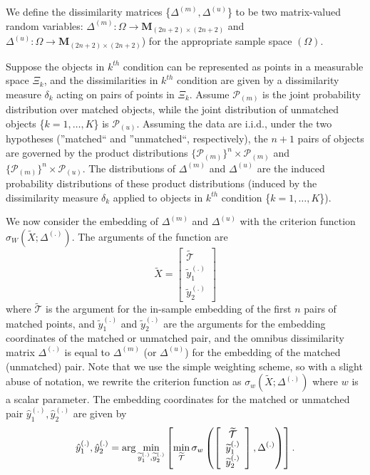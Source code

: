 \documentclass[12pt,oneside,final]{thesis}\usepackage[]{graphicx}\usepackage[]{color}
\begin{document}
We define the dissimilarity matrices \{$\Delta^{(m)},\Delta^{(u)}$\} to be  two matrix-valued random variables: $\Delta^{(m)}:\Omega \rightarrow \mathbf{M}_{(2n+2)\times (2n+2)} $ and  $\Delta^{(u)}:\Omega \rightarrow \mathbf{M}_{(2n+2)\times (2n+2)} $) for the appropriate sample  space $(\Omega)$.
\begin{remark}
Suppose the objects in $k^{th}$  condition  can be represented as points in a measurable space $\Xi_k$, and the dissimilarities in $k^{th}$ condition are given by  a dissimilarity measure $\delta_k$ acting on pairs of points in $\Xi_k$. Assume $\mathcal{P}_{(m)}$ is the joint probability distribution over matched objects, while the joint distribution of unmatched objects \{$k=1,\ldots,K$\}  is $\mathcal{P}_{(u)}$. Assuming the data are i.i.d., under the two hypotheses (''matched`` and ''unmatched``, respectively), the $n+1$ pairs of objects are governed  by the product distributions $\{\mathcal{P}_{(m)}\}^n \times \mathcal{P}_{(m)} $ and $\{\mathcal{P}_{(m)}\}^n \times \mathcal{P}_{(u)} $.  The distributions of $\Delta^{(m)}$ and $\Delta^{(u)}$ are the induced probability distributions of  these product distributions (induced by the  dissimilarity measure $\delta_k$ applied to  objects in $k^{th}$ condition \{$k=1,\ldots,K$\}).
\end{remark}




 We now consider the embedding of $\Delta^{(m)}$ and $\Delta^{(u)}$ with the criterion function  $\sigma_W(\widetilde{X}; \Delta^{(.)})$. The arguments of the function are  $$\widetilde{X}= \left[
\begin{array}{c}
{\widetilde{\mathcal{T}}} \\
\widetilde{y}_{1}^{(.)} \\
\widetilde{y}_{2}^{(.)}
\end {array}
\right]$$ where ${\widetilde{\mathcal{T}}}$ is the argument for the in-sample embedding of the first $n$ pairs of matched points, and
 $\widetilde{y}_{1}^{(.)} $ and $\widetilde{y}_{2}^{(.)} $ are the arguments for the embedding coordinates of the matched  or unmatched pair,
and the omnibus dissimilarity matrix $\Delta^{(.)}$ is equal to  $\Delta^{(m)}$  (or $\Delta^{(u)}$) for the embedding of the  matched (unmatched) pair. Note that we use the simple weighting scheme, so with a slight abuse of notation, we rewrite the criterion function as  $\sigma_w(\widetilde{X}; \Delta^{(.)})$ where $w$ is a scalar parameter.
The embedding coordinates for the matched or unmatched pair  ${\hat{y}_{1}^{(.)},\hat{y}_{2}^{(.)}}$ are given by
 \[
{\hat{y}_{1}^{(.)},\hat{y}_{2}^{(.)}}
=\arg\min_{\widetilde{y}_{1}^{(.)}, \widetilde{y}_{2}^{(.)}}\left[\min_{\widetilde{\mathcal{T}}}
{\sigma_w\left(
\left[
\begin{array}{c}
{\widetilde{\mathcal{T}}} \\
\widetilde{y}_{1}^{(.)} \\
\widetilde{y}_{2}^{(.)}
\end {array}
\right]
,
\Delta^{(.)}
\right)
}
\right]. \label{oos-embedding}
\]
\end{document}
